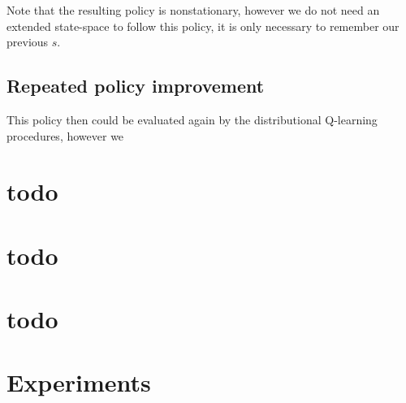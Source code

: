 Note that the resulting policy is nonstationary, however we do not need an extended state-space to follow this policy, it is only necessary to remember our previous $s$.

\subsection{Repeated policy improvement}
This policy then could be evaluated again by the distributional Q-learning procedures, however we 

\section{todo}


\section{todo}


\section{todo}


\section{Experiments}


